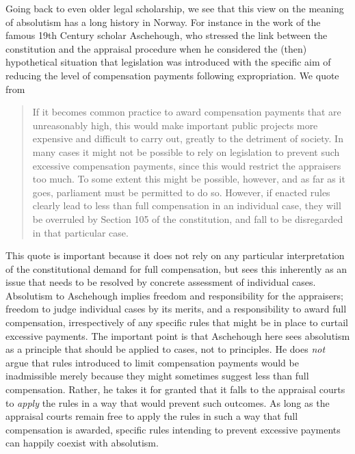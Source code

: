 Going back to even older legal scholarship, we see that this view on the meaning of absolutism has a long history in Norway. For instance in the work of the famous 19th Century scholar Aschehough, who stressed the link between the constitution and the appraisal procedure when he considered the (then) hypothetical situation that legislation was introduced with the specific aim of reducing the level of compensation payments following expropriation. We quote from \cite[p.48]{asch} 

\begin{quote}
If it becomes common practice to award compensation payments that are unreasonably high, this would make important public projects more expensive and difficult to carry out, greatly to the detriment of society. In many cases it might not be possible to rely on legislation to prevent such excessive compensation payments, since this would restrict the appraisers too much. To some extent this might be possible, however, and as far as it goes, parliament must be permitted to do so. However, if enacted rules clearly lead to less than full compensation in an individual case, they will be overruled by Section 105 of the constitution, and fall to be disregarded in that particular case.
\end{quote}

This quote is important because it does not rely on any particular interpretation of the constitutional demand for full compensation, but sees this inherently as an issue that needs to be resolved by concrete assessment of individual cases. Absolutism to Aschehough implies freedom and responsibility for the appraisers; freedom to judge individual cases by its merits, and a responsibility to award full compensation, irrespectively of any specific rules that might be in place to curtail excessive payments. The important point is that Aschehough here sees absolutism as a principle that should be applied to cases, not to principles. He does \emph{not} argue that rules introduced to limit compensation payments would be inadmissible merely because they might sometimes suggest less than full compensation. Rather, he takes it for granted that it falls to the appraisal courts to \emph{apply} the rules in a way that would prevent such outcomes. As long as the appraisal courts remain free to apply the rules in such a way that full compensation is awarded, specific rules intending to prevent excessive payments can happily coexist with absolutism.

